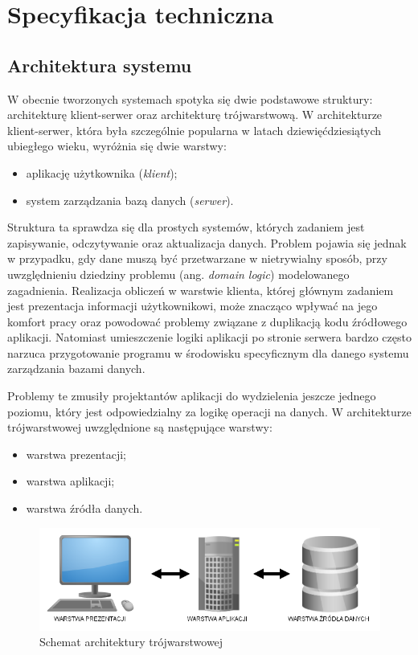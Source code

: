 \chapter{Specyfikacja techniczna}

\section{Architektura systemu}

W obecnie tworzonych systemach spotyka się dwie podstawowe struktury:
architekturę klient-serwer oraz architekturę trójwarstwową.  W
architekturze klient-serwer, która była szczególnie popularna w latach
dziewięćdziesiątych ubiegłego wieku, wyróżnia się dwie warstwy:
\begin{itemize}
\item aplikację użytkownika (\emph{klient});
\item system zarządzania bazą danych (\emph{serwer}).
\end{itemize}

Struktura ta sprawdza się dla prostych systemów, których zadaniem jest
zapisywanie, odczytywanie oraz aktualizacja danych. Problem pojawia
się jednak w przypadku, gdy dane muszą być przetwarzane w nietrywialny
sposób, przy uwzględnieniu dziedziny problemu (ang. \emph{domain
  logic}) modelowanego zagadnienia. Realizacja obliczeń w warstwie
klienta, której głównym zadaniem jest prezentacja informacji
użytkownikowi, może znacząco wpływać na jego komfort pracy oraz
powodować problemy związane z duplikacją kodu źródłowego aplikacji.
Natomiast umieszczenie logiki aplikacji po stronie serwera bardzo
często narzuca przygotowanie programu w środowisku specyficznym dla
danego systemu zarządzania bazami danych.

Problemy te zmusiły projektantów aplikacji do wydzielenia jeszcze
jednego poziomu, który jest odpowiedzialny za logikę operacji na
danych. W architekturze trójwarstwowej uwzględnione są następujące
warstwy:
\begin{itemize}
\item warstwa prezentacji;
\item warstwa aplikacji;
\item warstwa źródła danych.
\end{itemize}

\begin{figure}[h]
  \begin{center}
    \includegraphics[scale=0.5]{../img/arch-3warstw.png}
  \end{center}
  \label{fig:arch3warstw}
  \caption{Schemat architektury trójwarstwowej}
\end{figure}
\FloatBarrier

